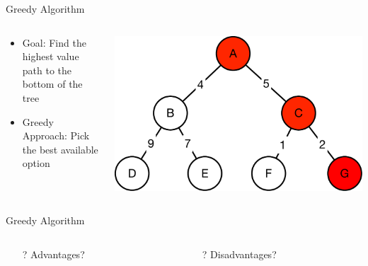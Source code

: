 \documentclass[aspectratio=169]{beamer}
\begin{document}
\begin{frame}{Greedy Algorithm}

\begin{columns}
\begin{column}{0.5\textwidth}
\begin{itemize}
\item Goal: Find the highest value path to the bottom of the tree
\item Greedy Approach: Pick the best available option
\end{itemize}
\end{column}
\begin{column}{0.5\textwidth}
\includegraphics[width=1\textwidth]{./lectUL/greedy3.pdf}
\end{column}
\end{columns}

\end{frame}
\begin{frame}{Greedy Algorithm}

\begin{columns}
\begin{column}{0.5\textwidth}
\begin{itemize}
\item[?] Advantages?
\end{itemize}
\end{column}
\begin{column}{0.5\textwidth}
\begin{itemize}
\item[?] Disadvantages?
\end{itemize}
\end{column}
\end{columns}

\end{frame}
\end{document}
